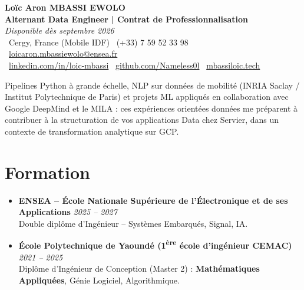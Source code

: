 \documentclass[a4paper,11pt]{article}
\begin{document}
\begin{center}
    {\Large \textbf{Loïc Aron MBASSI EWOLO}} \\ \vspace{4pt}
    \textbf{\large Alternant Data Engineer | Contrat de Professionnalisation} \\
    \textit{\small Disponible dès septembre 2026} \\ \vspace{4pt}
    \small
    \faMapMarker\ Cergy, France (Mobile IDF) \quad
    \faPhone\ (+33) 7 59 52 33 98 \quad
    \faEnvelope\ \href{mailto:loicaron.mbassiewolo@ensea.fr}{loicaron.mbassiewolo@ensea.fr} \\ \vspace{2pt}
    \faLinkedin\ \href{https://www.linkedin.com/in/loic-mbassi/}{linkedin.com/in/loic-mbassi} \quad
    \faGithub\ \href{https://github.com/Nameless0l}{github.com/Nameless0l} \quad
    \faGlobe\ \href{https://mbassiloic.tech}{mbassiloic.tech}
\end{center}

\vspace{-6pt}

\noindent\small{Pipelines Python à grande échelle, NLP sur données de mobilité (INRIA Saclay / Institut Polytechnique de Paris) et projets ML appliqués en collaboration avec Google DeepMind et le MILA : ces expériences orientées données me préparent à contribuer à la structuration de vos applications Data chez Servier, dans un contexte de transformation analytique sur GCP.}

\section{Formation}
\begin{itemize}[leftmargin=*, label=\tiny$\bullet$, nosep]
    \item \textbf{ENSEA -- École Nationale Supérieure de l'Électronique et de ses Applications} \hfill \textit{2025 -- 2027} \\
    \small{Double diplôme d'Ingénieur -- Systèmes Embarqués, Signal, IA.}
    \item \textbf{École Polytechnique de Yaoundé (1\textsuperscript{ère} école d'ingénieur CEMAC)} \hfill \textit{2021 -- 2025} \\
    \small{Diplôme d'Ingénieur de Conception (Master 2) : \textbf{Mathématiques Appliquées}, Génie Logiciel, Algorithmique.}
\end{itemize}
\end{document}
